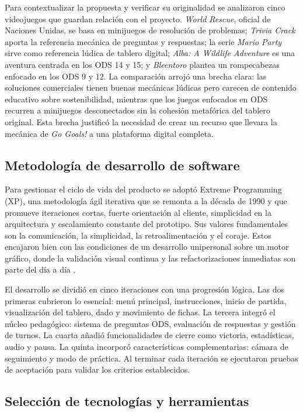 \documentclass[12pt,a4paper]{article}
\begin{document}
Para contextualizar la propuesta y verificar su originalidad se analizaron cinco videojuegos que guardan relación con el proyecto. \textit{World Rescue}, oficial de Naciones Unidas, se basa en minijuegos de resolución de problemas; \textit{Trivia Crack} aporta la referencia mecánica de preguntas y respuestas; la serie \textit{Mario Party} sirve como referencia lúdica de tablero digital; \textit{Alba: A Wildlife Adventure} es una aventura centrada en los ODS 14 y 15; y \textit{Bleentoro} plantea un rompecabezas enfocado en los ODS 9 y 12. La comparación arrojó una brecha clara: las soluciones comerciales tienen buenas mecánicas lúdicas pero carecen de contenido educativo sobre sostenibilidad, mientras que los juegos enfocados en ODS recurren a minijuegos desconectados sin la cohesión metafórica del tablero original. Esta brecha justificó la necesidad de crear un recurso que llevara la mecánica de \textit{Go Goals!} a una plataforma digital completa.

\subsection{Metodología de desarrollo de software}

Para gestionar el ciclo de vida del producto se adoptó Extreme Programming (XP), una metodología ágil iterativa que se remonta a la década de 1990 \citep{Beck2004} y que promueve iteraciones cortas, fuerte orientación al cliente, simplicidad en la arquitectura y escalamiento constante del prototipo. Sus valores fundamentales son la comunicación, la simplicidad, la retroalimentación y el coraje. Estos encajaron bien con las condiciones de un desarrollo unipersonal sobre un motor gráfico, donde la validación visual continua y las refactorizaciones inmediatas son parte del día a día \citep{Sommerville2021}.

El desarrollo se dividió en cinco iteraciones con una progresión lógica. Las dos primeras cubrieron lo esencial: menú principal, instrucciones, inicio de partida, visualización del tablero, dado y movimiento de fichas. La tercera integró el núcleo pedagógico: sistema de preguntas ODS, evaluación de respuestas y gestión de turnos. La cuarta añadió funcionalidades de cierre como victoria, estadísticas, audio y pausa. La quinta incorporó características complementarias: cámara de seguimiento y modo de práctica. Al terminar cada iteración se ejecutaron pruebas de aceptación para validar los criterios establecidos.

\subsection{Selección de tecnologías y herramientas}
\end{document}
